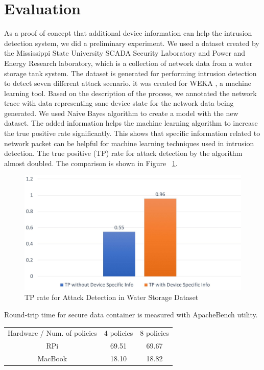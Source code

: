 \documentclass[conference]{IEEEtran}
\begin{document}
\section{Evaluation}
As a proof of concept that additional device information can help the intrusion detection system, we did a preliminary experiment. We used a dataset \cite{c7} created by the Mississippi State University SCADA Security Laboratory and Power and Energy Research laboratory, which is a collection of network data from a water storage tank system. The dataset is generated for performing intrusion detection to detect seven different attack scenario. it was created for WEKA \cite{c8}, a machine learning tool. Based on the description of the process, we annotated the network trace with data representing sane device state for the network data being generated. We used Naive Bayes algorithm to create a model with the new dataset. The added information helps the machine learning algorithm to increase the true positive rate significantly. This shows that specific information related to network packet can be helpful for machine learning techniques used in intrusion detection. The true positive (TP) rate for attack detection by the algorithm almost doubled. The comparison is shown in Figure ~\ref{eval-anomaly}.
\begin{figure}[htbp]
\centering
\centerline{\includegraphics [width=.5\textwidth]{chart.jpg}}
\caption{TP rate for Attack Detection in Water Storage Dataset}
\label{eval-anomaly}
%
\end{figure}

Round-trip time for secure data container is measured with ApacheBench utility. 
\begin{center}
\begin{tabular}{ |c|c|c| } 
 \hline
Hardware / Num. of policies & 4 policies & 8 policies \\ 
RPi & 69.51 & 69.67 \\
MacBook & 18.10 & 18.82 \\
 \hline
\end{tabular}
\end{center}
\end{document}

